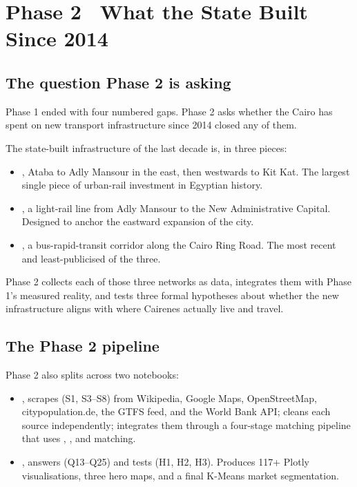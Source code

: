 
\section{Phase 2 \textbullet\ What the State Built Since 2014}
\label{sec:phase2-intro}

\subsection{The question Phase 2 is asking}

Phase 1 ended with four numbered gaps. Phase 2 asks whether the
 Cairo has spent on new transport infrastructure
since 2014 closed any of them.

The state-built infrastructure of the last decade is, in three pieces:

\begin{itemize}
 \item {}, Ataba to Adly Mansour in the east,
 then westwards to Kit Kat. The largest single piece of urban-rail
 investment in Egyptian history.
 \item {}, a light-rail line from Adly Mansour to the
 New Administrative Capital. Designed to anchor the eastward
 expansion of the city.
 \item {}, a bus-rapid-transit corridor along the
 Cairo Ring Road. The most recent and least-publicised of the
 three.
\end{itemize}

Phase 2 collects each of those three networks as data, integrates
them with Phase 1's measured reality, and tests three formal hypotheses
about whether the new infrastructure aligns with where Cairenes
actually live and travel.

\subsection{The Phase 2 pipeline}

Phase 2 also splits across two notebooks:

\begin{itemize}
 \item {},
 scrapes  (S1, S3--S8) from Wikipedia, Google
 Maps, OpenStreetMap, citypopulation.de, the GTFS feed, and the
 World Bank API; cleans each source independently; integrates
 them through a four-stage matching pipeline that uses
 , ,  and  matching.
 \item {}, answers
  (Q13--Q25) and tests
  (H1, H2, H3). Produces 117+
 Plotly visualisations, three hero maps, and a final
 K-Means market segmentation.
\end{itemize}

